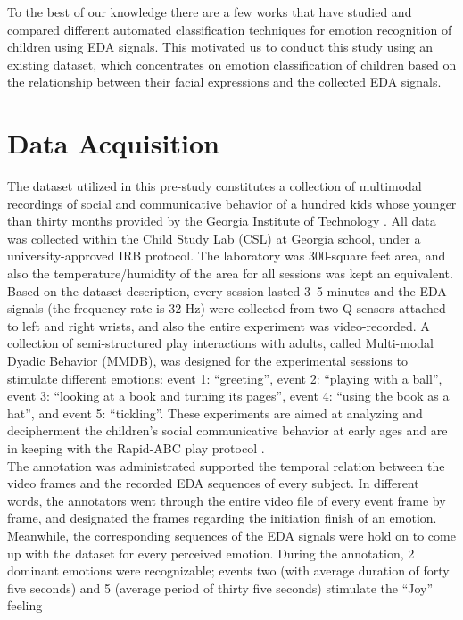 To the best of our knowledge there are a few works \cite{EmotionResp2013, SlowEcho2009} 
that have studied and compared different automated 
classification techniques for emotion recognition of children using EDA signals. 
This motivated us to conduct this study using an existing dataset, which concentrates 
on emotion classification of children based on the relationship between their facial 
expressions and the collected EDA signals.\\

\section{Data Acquisition}
The dataset utilized in this pre-study constitutes a collection of multimodal recordings of social and 
communicative behavior of a hundred kids whose younger than thirty months provided by the Georgia 
Institute of Technology \cite{rehg2013decoding}. All data was collected within the Child Study 
Lab (CSL) at Georgia school, under a university-approved IRB protocol. The laboratory was 
300-square feet area, and also the temperature/humidity of the area for all sessions was 
kept an equivalent. Based on the dataset description, every session lasted 3–5 minutes and the 
EDA signals (the frequency rate is 32 Hz) were collected from two Q-sensors attached to 
left and right wrists, and also the entire experiment was video-recorded. A collection of semi-structured 
play interactions with adults, called Multi-modal Dyadic Behavior (MMDB), was designed 
for the experimental sessions to stimulate different emotions: event 1: “greeting”, 
event 2: “playing with a ball”, event 3: “looking at a book and turning its pages”,
event 4: “using the book as a hat”, and event 5: “tickling”. These experiments are aimed 
at analyzing and decipherment the children’s social communicative behavior at early ages 
and are in keeping with the Rapid-ABC play protocol \cite{ousley2012rapid}.\\
The annotation was administrated supported the temporal relation between the video frames and 
the recorded EDA sequences of every subject. In different words, the annotators went through 
the entire video file of every event frame by frame, and designated the frames regarding 
the initiation finish of an emotion. Meanwhile, the corresponding sequences of 
the EDA signals were hold on to come up with the dataset for every perceived emotion. During 
the annotation, 2 dominant emotions were recognizable; events two (with average 
duration of forty five seconds) and 5 (average period of thirty five seconds) stimulate the “Joy” feeling 
